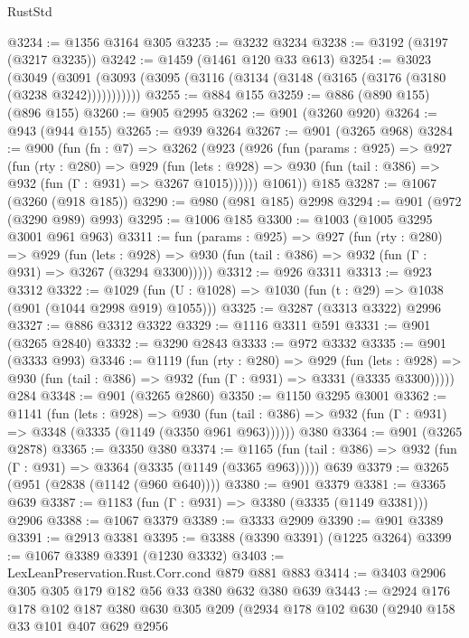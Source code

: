 \begin{lexlean}{RustStd}
\begin{coremodule}
@3234 := @1356 @3164 @305
@3235 := @3232 @3234
@3238 := @3192 (@3197 (@3217 @3235))
@3242 := @1459 (@1461 @120 @33 @613)
@3254 := @3023
    (@3049 (@3091 (@3093 (@3095 (@3116 (@3134 (@3148 (@3165 (@3176 (@3180 (@3238 @3242)))))))))))
@3255 := @884 @155
@3259 := @886 (@890 @155) (@896 @155)
@3260 := @905 @2995
@3262 := @901 (@3260 @920)
@3264 := @943 (@944 @155)
@3265 := @939 @3264
@3267 := @901 (@3265 @968)
@3284 := @900
    (fun (fn : @7) =>
    @3262
      (@923
        (@926
          (fun (params : @925) =>
          @927
            (fun (rty : @280) =>
            @929
              (fun (lets : @928) =>
              @930 (fun (tail : @386) => @932 (fun (Γ : @931) => @3267 @1015))))))
        @1061))
    @185
@3287 := @1067 (@3260 (@918 @185))
@3290 := @980 (@981 @185) @2998
@3294 := @901 (@972 (@3290 @989) @993)
@3295 := @1006 @185
@3300 := @1003 (@1005 @3295 @3001 @961 @963)
@3311 := fun (params : @925) =>
  @927
    (fun (rty : @280) =>
    @929
      (fun (lets : @928) =>
      @930 (fun (tail : @386) => @932 (fun (Γ : @931) => @3267 (@3294 @3300)))))
@3312 := @926 @3311
@3313 := @923 @3312
@3322 := @1029 (fun (U : @1028) => @1030 (fun (t : @29) => @1038 (@901 (@1044 @2998 @919) @1055)))
@3325 := @3287 (@3313 @3322) @2996
@3327 := @886 @3312 @3322
@3329 := @1116 @3311 @591
@3331 := @901 (@3265 @2840)
@3332 := @3290 @2843
@3333 := @972 @3332
@3335 := @901 (@3333 @993)
@3346 := @1119
    (fun (rty : @280) =>
    @929
      (fun (lets : @928) =>
      @930 (fun (tail : @386) => @932 (fun (Γ : @931) => @3331 (@3335 @3300)))))
    @284
@3348 := @901 (@3265 @2860)
@3350 := @1150 @3295 @3001
@3362 := @1141
    (fun (lets : @928) =>
    @930 (fun (tail : @386) => @932 (fun (Γ : @931) => @3348 (@3335 (@1149 (@3350 @961 @963))))))
    @380
@3364 := @901 (@3265 @2878)
@3365 := @3350 @380
@3374 := @1165
    (fun (tail : @386) => @932 (fun (Γ : @931) => @3364 (@3335 (@1149 (@3365 @963)))))
    @639
@3379 := @3265 (@951 (@2838 (@1142 (@960 @640))))
@3380 := @901 @3379
@3381 := @3365 @639
@3387 := @1183 (fun (Γ : @931) => @3380 (@3335 (@1149 @3381))) @2906
@3388 := @1067 @3379
@3389 := @3333 @2909
@3390 := @901 @3389
@3391 := @2913 @3381
@3395 := @3388 (@3390 @3391) (@1225 @3264)
@3399 := @1067 @3389 @3391 (@1230 @3332)
@3403 := LexLeanPreservation.Rust.Corr.cond @879 @881 @883
@3414 := @3403 @2906 @305 @305 @179 @182 @56 @33 @380 @632 @380 @639
@3443 := @2924
    @176
    @178
    @102
    @187
    @380
    @630
    @305
    @209
    (@2934
      @178
      @102
      @630
      (@2940
        @158
        @33
        @101
        @407
        @629
        @2956

\end{coremodule}
\end{lexlean}
